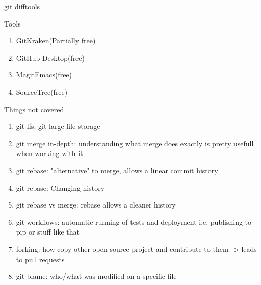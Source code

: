 \documentclass{beamer}
\begin{document}
\begin{frame}[fragile,t]{git difftools}\vspace{10pt}
\end{frame}

\begin{frame}[fragile,t]{Tools}\vspace{10pt}
  \begin{enumerate}
    \item GitKraken(Partially free)
      \item GitHub Desktop(free)
    \item Magit{Emacs}(free)
    \item SourceTree(free)
  \end{enumerate}
\end{frame}


\begin{frame}[fragile,t]{Things not covered}\vspace{10pt}
  \begin{enumerate}
    \item git lfs: git large file storage
    \item git merge in-depth: understanding what merge does exactly is pretty usefull when working with it
    \item git rebase: "alternative" to merge, allows a linear commit history %
    \item git rebase: Changing history %
    \item git rebase vs merge: rebase allows a cleaner history
    \item git workflows: automatic running of tests and deployment i.e. publishing to pip or stuff like that
    \item forking: how copy other open source project and contribute to them -> leads to pull requests
    \item git blame: who/what was modified on a specific file
  \end{enumerate}
\end{frame}
\end{document}
